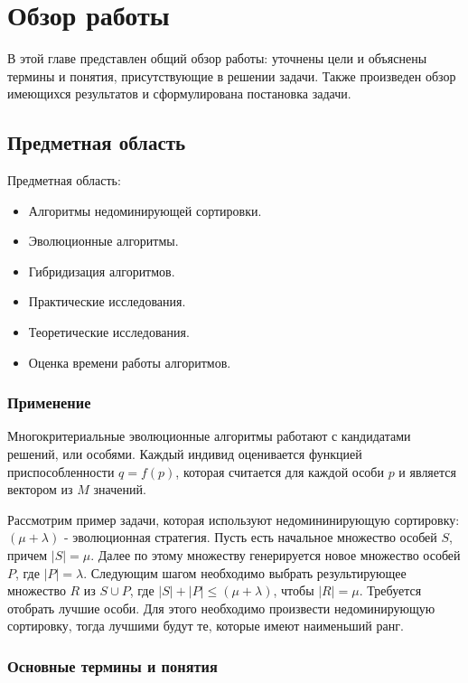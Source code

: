 
\chapter{Обзор работы}
\label{chapter1}

В этой главе представлен общий обзор работы: уточнены цели и объяснены термины и понятия, присутствующие в решении задачи. Также произведен обзор имеющихся результатов и сформулирована постановка задачи.

\section{Предметная область}
Предметная область:

\begin{itemize}
\item Алгоритмы недоминирующей сортировки.
\item Эволюционные алгоритмы.
\item Гибридизация алгоритмов.
\item Практические исследования.
\item Теоретические исследования.
\item Оценка времени работы алгоритмов.
\end{itemize}

\subsection{Применение}
Многокритериальные эволюционные алгоритмы работают с кандидатами решений, или особями. Каждый индивид оценивается функцией приспособленности $q=f(p)$, которая считается для каждой особи $p$ и является вектором из $M$ значений. 

Рассмотрим пример задачи, которая используют недомининирующую сортировку: $(\mu + \lambda)$ - эволюционная стратегия. Пусть есть начальное множество особей $S$, причем $|S| = \mu$. Далее по этому множеству генерируется новое множество особей $P$, где  $|P| = \lambda$. Следующим шагом необходимо выбрать результирующее множество $R$ из $S \cup P$, где $|S|+|P| \leq (\mu + \lambda)$, чтобы $|R|= \mu$. Требуется отобрать лучшие особи. Для этого необходимо произвести недоминирующую сортировку, тогда лучшими будут те, которые имеют наименьший ранг.

\subsection{Основные термины и понятия}

